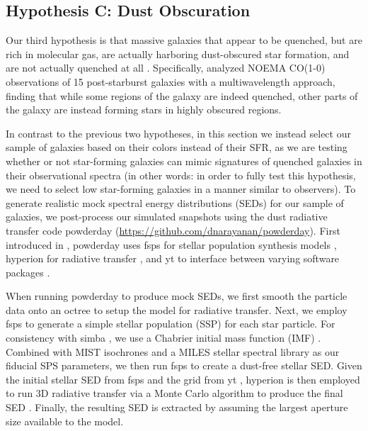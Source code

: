 \documentclass[twocolumn, linenumbers]{aastex631}
\newcommand{\simba}[0]{{\sc simba} }
\newcommand{\yt}[0]{{\sc yt} }
\newcommand{\powderday}[0]{{\sc powderday} }
\newcommand{\hyperion}[0]{{\sc hyperion} }
\newcommand{\fsps}[0]{{\sc fsps} }
\begin{document}
\subsection{Hypothesis C: Dust Obscuration}
\label{ssec:HC}
Our third hypothesis is that massive galaxies that appear to be quenched, but are rich in molecular gas, are actually harboring dust-obscured star formation, and are not actually quenched at all \citep[e.g.,][]{Baron22, Baron2023, pengPei, cenci25}.  Specifically, \cite{Baron2023} analyzed NOEMA CO(1-0) observations of 15 post-starburst galaxies with a multiwavelength approach, finding that while some regions of the galaxy are indeed quenched, other parts of the galaxy are instead forming stars in highly obscured regions.

In contrast to the previous two hypotheses, in this section we instead select our sample of galaxies based on their colors instead of their SFR, as we are testing whether or not star-forming galaxies can mimic signatures of quenched galaxies in their observational spectra (in other words: in order to fully test this hypothesis, we need to select low star-forming galaxies in a manner similar to observers).  To generate realistic mock spectral energy distributions (SEDs) for our sample of galaxies, we post-process our simulated snapshots using the dust radiative transfer code \powderday (\url{https://github.com/dnarayanan/powderday}).  First introduced in \cite{powderday}, \powderday uses \fsps for stellar population synthesis models \citep{conroy1, conroy2, conroy3}, \hyperion for radiative transfer \citep{hyperion}, and \yt to interface between varying software packages \citep{yt}.

When running \powderday to produce mock SEDs, we first smooth the particle data onto an octree to setup the model for radiative transfer.  Next, we employ \fsps to generate a simple stellar population (SSP) for each star particle.  For consistency with \simba\!\!\!, we use a Chabrier initial mass function (IMF) \citep{simba}.  Combined with MIST isochrones \citep{Choi16, Dotter_2016} and a MILES stellar spectral library \citep{Sanchez06} as our fiducial SPS parameters, we then run \fsps to create a dust-free stellar SED.  Given the initial stellar SED from \fsps and the grid from \yt\!\!, \hyperion is then employed to run 3D radiative transfer via a Monte Carlo algorithm to produce the final SED \citep{hyperion}.  Finally, the resulting SED is extracted by assuming the largest aperture size available to the model.
\end{document}
